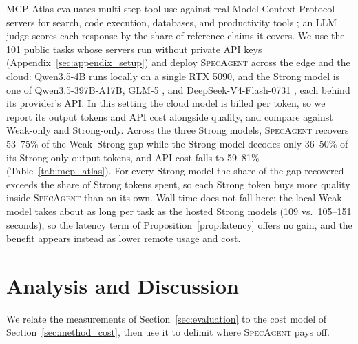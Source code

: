 \documentclass[11pt, copyright, logo, secondlogo]{template/lark}
\newcommand{\SpecAgent}{\textsc{SpecAgent}\xspace}
\begin{document}
 MCP-Atlas evaluates multi-step tool use against real Model Context Protocol
servers for search, code execution, databases, and productivity tools
\citep{anthropic2024mcp,bandi2026mcpatlas}; an LLM judge scores each response
by the share of reference claims it covers. We use the 101 public tasks whose
servers run without private API keys (Appendix~\ref{sec:appendix_setup}) and
deploy \SpecAgent{} across the edge and the cloud: Qwen3.5-4B runs locally on
a single RTX 5090, and the Strong model is one of Qwen3.5-397B-A17B, GLM-5
\citep{glm2026glm5}, and DeepSeek-V4-Flash-0731 \citep{deepseek2026v4}, each
behind its provider's API. In this setting the cloud model is billed per token,
so we report its output tokens and API cost alongside quality, and compare
against Weak-only and Strong-only.
Across the three Strong models, \SpecAgent{} recovers 53--75\% of the
Weak--Strong gap while the Strong model decodes only 36--50\% of its
Strong-only output tokens, and API cost falls to 59--81\%
(Table~\ref{tab:mcp_atlas}). For every Strong model the share of the gap
recovered exceeds the share of Strong tokens spent, so each Strong token buys
more quality inside \SpecAgent{} than on its own. Wall
time does not fall here: the local Weak model takes about as long per task as
the hosted Strong models (109 vs.\ 105--151 seconds), so the latency term of
Proposition~\ref{prop:latency} offers no gain, and the benefit appears
instead as lower remote usage and cost.


\section{Analysis and Discussion}
\label{sec:analysis}

We relate the measurements of Section~\ref{sec:evaluation} to the cost model of
Section~\ref{sec:method_cost}, then use it to delimit where \SpecAgent{} pays
off.
\end{document}
